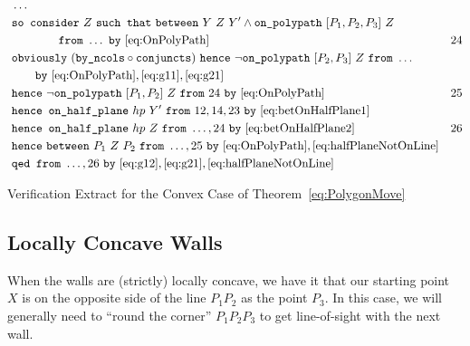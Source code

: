 \begin{boxedfigure}
\small
\begin{align*}
&\ldots\\
&\code{so consider}\ Z\ \code{such that}\ \between{Y}{Z}{Y'} \wedge \code{on\_polypath}\ [P_1,P_2,P_3]\ Z\\\
&\qquad\qquad\code{from}\ \ldots\ \code{by}\ \eqref{eq:OnPolyPath} & 24\\
&\code{obviously}\ (\code{by\_ncols}\circ\code{conjuncts})\ \code{hence}\ \neg\code{on\_polypath}\ [P_2,P_3]\ Z\ \code{from}\ \ldots\\
&\qquad\code{by}\ \eqref{eq:OnPolyPath},\eqref{eq:g11},\eqref{eq:g21}\\
&\code{hence}\ \neg\code{on\_polypath}\ [P_1,P_2]\ Z\ \code{from}\ 24\ \code{by}\ \eqref{eq:OnPolyPath}&25\\
&\code{hence on\_half\_plane}\ hp\ Y'\ \code{from}\ 12,14,23\ \code{by}\ \eqref{eq:betOnHalfPlane1}\\
&\code{hence on\_half\_plane}\ hp\ Z\ \code{from}\ \ldots,24\ \code{by}\ \eqref{eq:betOnHalfPlane2} & 26\\
&\code{hence}\ \between{P_1}{Z}{P_2}\ \code{from}\ \ldots,25\ \code{by}\ \eqref{eq:OnPolyPath},\eqref{eq:halfPlaneNotOnLine}\\
&\code{qed from}\ \ldots,26\ \code{by}\ \eqref{eq:g12},\eqref{eq:g21},\eqref{eq:halfPlaneNotOnLine}
\end{align*}
\caption{Verification Extract for the Convex Case of Theorem~\ref{eq:PolygonMove}}
\label{fig:ConvexVerification}
\end{boxedfigure}

\subsection{Locally Concave Walls}
When the walls are (strictly) locally concave, we have it that our starting point $X$ is on the opposite side of the line $P_1P_2$ as the point $P_3$. In this case, we will generally need to ``round the corner'' $P_1P_2P_3$ to get line-of-sight with the next wall. 

